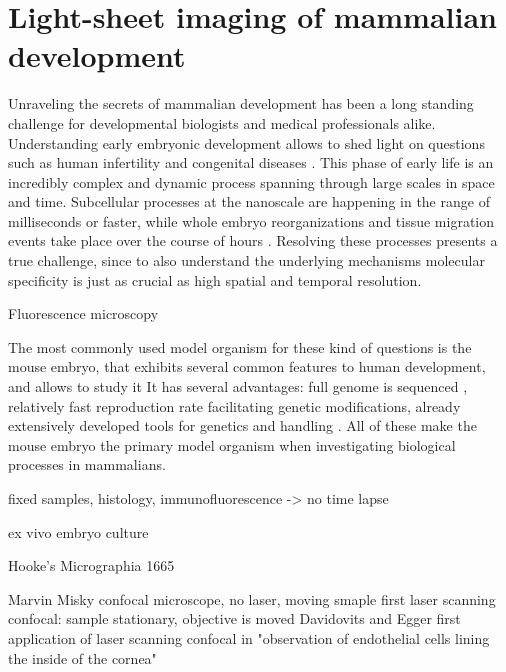 

\chapter{Light-sheet imaging of mammalian development}

\graphicspath{{./figures/1_spim/}}

Unraveling the secrets of mammalian development has been a long standing challenge for developmental biologists and medical professionals alike. Understanding early embryonic development allows to shed light on questions such as human infertility and congenital diseases \cite{todo}. 
This phase of early life is an incredibly complex and dynamic process spanning through large scales in space and time. Subcellular processes at the nanoscale are happening in the range of milliseconds or faster, while whole embryo reorganizations and tissue migration events take place over the course of hours \cite{gilbert_developmental_2013}. Resolving these processes presents a true challenge, since to also understand the underlying mechanisms molecular specificity is just as crucial as high spatial and temporal resolution.

Fluorescence microscopy \cite{diaspro_optical_2011}

The most commonly used model organism for these kind of questions is the mouse embryo, that exhibits several common features to human development, and allows to study it 
It has several advantages: full genome is sequenced \cite{mouse_genome_sequencing_consortium_initial_2002}, relatively fast reproduction rate facilitating genetic modifications, already extensively developed tools for genetics and handling \cite{capecchi_new_1989,silver_mouse_1995}. All of these make the mouse embryo the primary model organism when investigating biological processes in mammalians.

fixed samples, histology, immunofluorescence -> no time lapse

ex vivo embryo culture

Hooke's Micrographia 1665 \cite{hooke_micrographia:_1665}

Marvin Misky confocal microscope, no laser, moving smaple \cite{minsky_microscopy_1961}
first laser scanning confocal: sample stationary, objective is moved Davidovits and Egger \cite{davidovits_scanning_1969}
first application of laser scanning confocal in "observation of endothelial cells lining the inside of the cornea" \cite{davidovits_photomicrography_1973}

